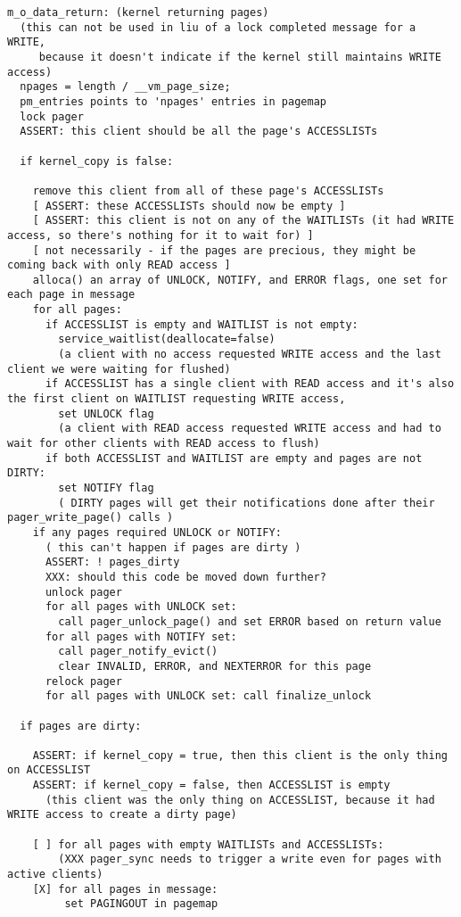 \documentclass{article}
\begin{document}
\begin{verbatim}
m_o_data_return: (kernel returning pages)
  (this can not be used in liu of a lock completed message for a WRITE,
     because it doesn't indicate if the kernel still maintains WRITE access)
  npages = length / __vm_page_size;
  pm_entries points to 'npages' entries in pagemap
  lock pager
  ASSERT: this client should be all the page's ACCESSLISTs

  if kernel_copy is false:

    remove this client from all of these page's ACCESSLISTs
    [ ASSERT: these ACCESSLISTs should now be empty ]
    [ ASSERT: this client is not on any of the WAITLISTs (it had WRITE access, so there's nothing for it to wait for) ]
    [ not necessarily - if the pages are precious, they might be coming back with only READ access ]
    alloca() an array of UNLOCK, NOTIFY, and ERROR flags, one set for each page in message
    for all pages:
      if ACCESSLIST is empty and WAITLIST is not empty:
        service_waitlist(deallocate=false)
        (a client with no access requested WRITE access and the last client we were waiting for flushed)
      if ACCESSLIST has a single client with READ access and it's also the first client on WAITLIST requesting WRITE access,
        set UNLOCK flag
        (a client with READ access requested WRITE access and had to wait for other clients with READ access to flush)
      if both ACCESSLIST and WAITLIST are empty and pages are not DIRTY:
        set NOTIFY flag
        ( DIRTY pages will get their notifications done after their pager_write_page() calls )
    if any pages required UNLOCK or NOTIFY:
      ( this can't happen if pages are dirty )
      ASSERT: ! pages_dirty
      XXX: should this code be moved down further?
      unlock pager
      for all pages with UNLOCK set:
        call pager_unlock_page() and set ERROR based on return value
      for all pages with NOTIFY set:
        call pager_notify_evict()
        clear INVALID, ERROR, and NEXTERROR for this page
      relock pager
      for all pages with UNLOCK set: call finalize_unlock

  if pages are dirty:

    ASSERT: if kernel_copy = true, then this client is the only thing on ACCESSLIST
    ASSERT: if kernel_copy = false, then ACCESSLIST is empty
      (this client was the only thing on ACCESSLIST, because it had WRITE access to create a dirty page)

    [ ] for all pages with empty WAITLISTs and ACCESSLISTs:
        (XXX pager_sync needs to trigger a write even for pages with active clients)
    [X] for all pages in message:
         set PAGINGOUT in pagemap


\end{verbatim}
\end{document}
